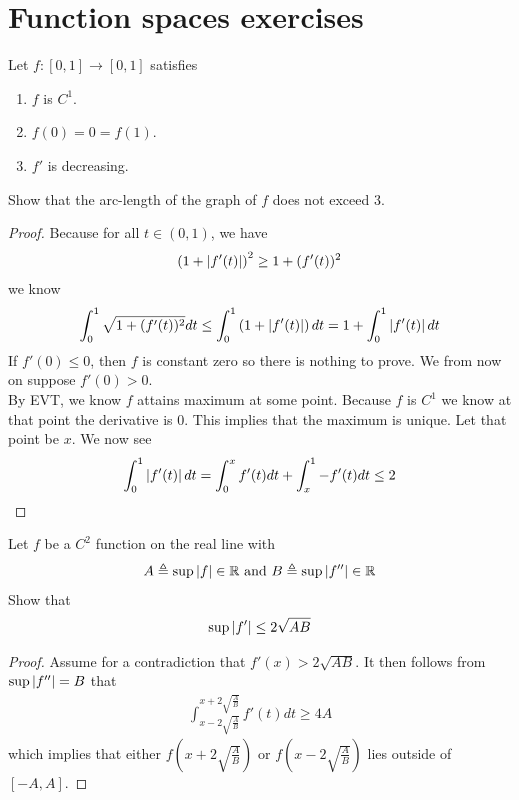 \documentclass{report}
\begin{document}
\section{Function spaces exercises}
\begin{question}{}{}
Let $f:[0,1]\rightarrow [0,1]$ satisfies 
\begin{enumerate}[label=(\roman*)]
  \item $f$ is  $C^1$.  
  \item $f(0)=0=f(1)$. 
  \item $f'$ is decreasing. 
\end{enumerate}
Show that the arc-length of the graph of $f$ does not exceed $3$. 
\end{question}
\begin{proof}
Because for all $t \in(0,1)$, we have 
\begin{align*}
 \left( 1+ \left|f'(t)\right| \right)^2 \geq 1 + (f'(t))^2
\end{align*}
we know 
\begin{align*}
\int_0^1 \sqrt{1+ (f'(t))^2 } dt \leq \int_0^1  \left( 1 + \left|f'(t)\right| \right) dt  =  1+ \int_0^1 \left|f'(t)\right|dt
\end{align*}
If $f'(0)\leq 0$, then $f$ is constant zero so there is nothing to prove. We from now on suppose  $f'(0)>0$.\\ 

By EVT, we know $f$ attains maximum at some point. Because $f$ is $C^1$ we know at that point the derivative is  $0$. This implies that the maximum is unique. Let that point be $x$. We now see 
\begin{align*}
\int_0^1 \left|f'(t)\right|dt = \int_0^x f'(t)dt + \int_x^1 -f'(t)dt \leq 2
\end{align*}
\end{proof}
\begin{question}{}{}
Let $f$ be a  $C^2$ function on the real line with 
 \begin{align*}
A\triangleq \sup \left|f\right| \in\mathbb{R}\text{ and }B\triangleq \sup \left|f''\right| \in\mathbb{R} 
\end{align*}
Show that 
\begin{align*}
\sup\left|f'\right| \leq 2\sqrt{AB} 
\end{align*}
\end{question}
\begin{proof}
Assume for a contradiction that $f'(x)> 2\sqrt{AB}$. It then follows from $\sup \left|f''\right|=B$ that 
\begin{align*}
\int_{x- 2\sqrt{\frac{A}{B}}}^{x+ 2 \sqrt{\frac{A}{B}} } f'(t) dt \geq 4A 
\end{align*}
which implies that either $f(x+ 2 \sqrt{\frac{A}{B}} )$ or $f(x- 2 \sqrt{\frac{A}{B}} )$ lies outside of $[-A,A]$. 
\end{proof}
\end{document}
